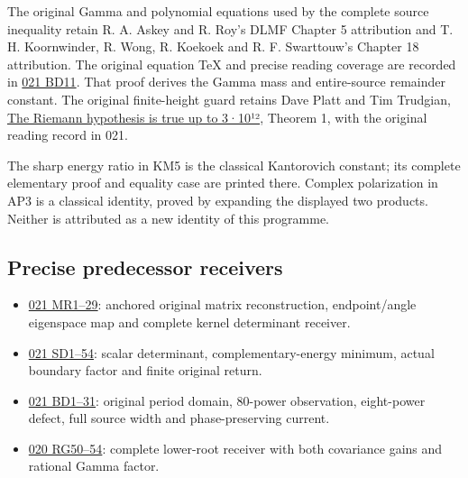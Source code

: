 \documentclass[11pt]{article}
\begin{document}
The original Gamma and polynomial equations used by the complete source inequality retain R. A. Askey and R. Roy's DLMF Chapter 5 attribution and T. H. Koornwinder, R. Wong, R. Koekoek and R. F. Swarttouw's Chapter 18 attribution. The original equation TeX and precise reading coverage are recorded in \href{https://github.com/KokunoYumeto/zeta-function-research-reader/blob/e40b46fde72c245dd79ef5691f59c21d6cbf0c75/workbenches/splitzero-tandem/continuations/20260922-original-observation-recovery/BOUNDED_DEGREE_PROOFS.md}{021 BD11}. That proof derives the Gamma mass and entire-source remainder constant. The original finite-height guard retains Dave Platt and Tim Trudgian, \href{https://arxiv.org/abs/2004.09765}{The Riemann hypothesis is true up to 3·10¹²}, Theorem 1, with the original reading record in 021.

The sharp energy ratio in KM5 is the classical Kantorovich constant; its complete elementary proof and equality case are printed there. Complex polarization in AP3 is a classical identity, proved by expanding the displayed two products. Neither is attributed as a new identity of this programme.

\subsection{Precise predecessor receivers}\label{precise-predecessor-receivers}

\begin{itemize}
\tightlist
\item
  \href{https://github.com/KokunoYumeto/zeta-function-research-reader/blob/e40b46fde72c245dd79ef5691f59c21d6cbf0c75/workbenches/splitzero-tandem/continuations/20260922-original-observation-recovery/MATRIX_RECOVERY_PROOFS.md}{021 MR1--29}: anchored original matrix reconstruction, endpoint/angle eigenspace map and complete kernel determinant receiver.
\item
  \href{https://github.com/KokunoYumeto/zeta-function-research-reader/blob/e40b46fde72c245dd79ef5691f59c21d6cbf0c75/workbenches/splitzero-tandem/continuations/20260922-original-observation-recovery/SCALAR_RECOVERY_PROOFS.md}{021 SD1--54}: scalar determinant, complementary-energy minimum, actual boundary factor and finite original return.
\item
  \href{https://github.com/KokunoYumeto/zeta-function-research-reader/blob/e40b46fde72c245dd79ef5691f59c21d6cbf0c75/workbenches/splitzero-tandem/continuations/20260922-original-observation-recovery/BOUNDED_DEGREE_PROOFS.md}{021 BD1--31}: original period domain, 80-power observation, eight-power defect, full source width and phase-preserving current.
\item
  \href{https://github.com/KokunoYumeto/zeta-function-research-reader/blob/13ca9b136fcdae48df7454bd9bf99e1ef22dd03c/workbenches/splitzero-tandem/continuations/20260922-original-growth-resolvent/GROWTH_PROOFS.md}{020 RG50--54}: complete lower-root receiver with both covariance gains and rational Gamma factor.
\end{itemize}
\end{document}
